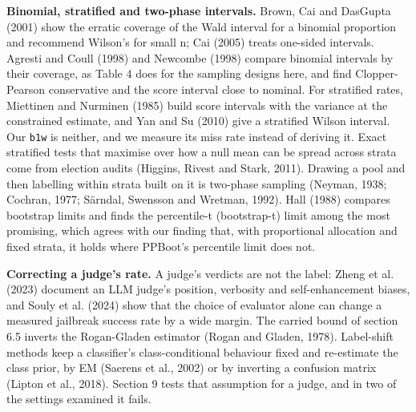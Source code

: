 \documentclass[11pt]{article}
\begin{document}
\textbf{Binomial, stratified and two-phase intervals.} Brown, Cai and DasGupta (2001) show the erratic coverage of the Wald interval for a binomial proportion and recommend Wilson's for small n; Cai (2005) treats one-sided intervals. Agresti and Coull (1998) and Newcombe (1998) compare binomial intervals by their coverage, as Table 4 does for the sampling designs here, and find Clopper-Pearson conservative and the score interval close to nominal. For stratified rates, Miettinen and Nurminen (1985) build score intervals with the variance at the constrained estimate, and Yan and Su (2010) give a stratified Wilson interval. Our \texttt{b1w} is neither, and we measure its miss rate instead of deriving it. Exact stratified tests that maximise over how a null mean can be spread across strata come from election audits (Higgins, Rivest and Stark, 2011). Drawing a pool and then labelling within strata built on it is two-phase sampling (Neyman, 1938; Cochran, 1977; Särndal, Swensson and Wretman, 1992). Hall (1988) compares bootstrap limits and finds the percentile-t (bootstrap-t) limit among the most promising, which agrees with our finding that, with proportional allocation and fixed strata, it holds where PPBoot's percentile limit does not.


\textbf{Correcting a judge's rate.} A judge's verdicts are not the label: Zheng et al. (2023) document an LLM judge's position, verbosity and self-enhancement biases, and Souly et al. (2024) show that the choice of evaluator alone can change a measured jailbreak success rate by a wide margin. The carried bound of section 6.5 inverts the Rogan-Gladen estimator (Rogan and Gladen, 1978). Label-shift methods keep a classifier's class-conditional behaviour fixed and re-estimate the class prior, by EM (Saerens et al., 2002) or by inverting a confusion matrix (Lipton et al., 2018). Section 9 tests that assumption for a judge, and in two of the settings examined it fails.
\end{document}
